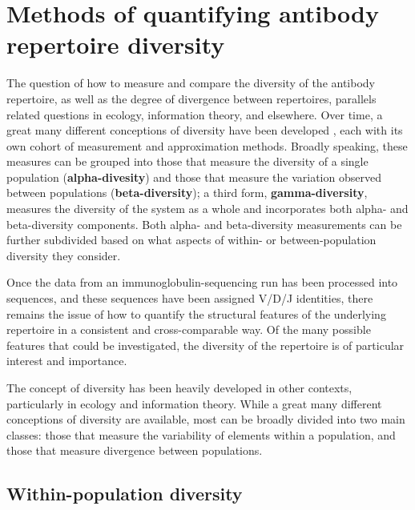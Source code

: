 \chapter{Methods of quantifying antibody repertoire diversity} %
\label{app:diversity}



The question of how to measure and compare the diversity of the antibody repertoire, as well as the degree of divergence between repertoires, parallels related questions in ecology, information theory, and elsewhere. Over time, a great many different conceptions of diversity have been developed \citep{peet1974diversity}, each with its own cohort of measurement and approximation methods. Broadly speaking, these measures can be grouped into those that measure the diversity of a single population (\textbf{alpha-divesity}) and those that measure the variation observed between populations (\textbf{beta-diversity}); a third form, \textbf{gamma-diversity}, measures the diversity of the system as a whole and incorporates both alpha- and beta-diversity components. Both alpha- and beta-diversity measurements can be further subdivided based on what aspects of within- or between-population diversity they consider. 


Once the data from an immunoglobulin-sequencing run has been processed into sequences, and these sequences have been assigned V/D/J identities, there remains the issue of how to quantify the structural features of the underlying repertoire in a consistent and cross-comparable way. Of the many possible features that could be investigated, the diversity of the repertoire is of particular interest and importance. 

The concept of diversity has been heavily developed in other contexts, particularly in ecology and information theory. While a great many different conceptions of diversity are available, most can be broadly divided into two main classes: those that measure the variability of elements within a population, and those that measure divergence between populations.

\section{Within-population diversity}
\label{sec:within}

